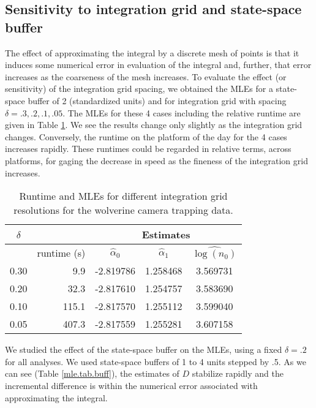 \subsection{Sensitivity to integration grid and state-space buffer}

The effect of approximating the integral by a discrete mesh of points
is that it induces some numerical error in evaluation of the integral
and, further, that error increases as the
coarseness of the mesh increases. 
To evaluate the effect (or sensitivity) of the integration grid
spacing, 
we obtained the MLEs for a state-space buffer of 2 (standardized
units) and for integration grid with spacing $\delta = .3, .2, .1,
.05$. The MLEs for these 4 cases including the relative runtime are
given in Table \ref{mle.tab.integration}.
We see the results change only slightly as the
integration grid changes. Conversely, the runtime on the platform of
the day for the 4 cases increases rapidly. 
These runtimes could be regarded in
relative terms,  across platforms, for gaging the decrease in
speed as the fineness of the integration grid increases.

\begin{table}[ht]
\centering
\caption{Runtime and MLEs for different integration grid resolutions
  for the wolverine camera trapping data.}
\begin{tabular}{crccc}
\hline \hline
$\delta$ &   & \multicolumn{3}{c}{Estimates} \\ \hline
         &  runtime (s)       & $\hat{\alpha}_0$ & $\hat{\alpha}_1$ &  $\widehat{\log(n_0)}$ \\ \hline
 0.30   &  9.9  &  -2.819786 & 1.258468 & 3.569731  \\
 0.20   & 32.3  &  -2.817610 & 1.254757 & 3.583690 \\
 0.10  & 115.1  &  -2.817570 & 1.255112 & 3.599040 \\
 0.05 &  407.3 &   -2.817559&  1.255281&  3.607158 \\ \hline
\end{tabular}
\label{mle.tab.integration}
\end{table}

We studied the effect of the state-space buffer on the MLEs, using a
fixed $\delta = .2$ for all analyses.  We used state-space buffers of
1 to 4 units stepped by .5.  As we can see (Table \ref{mle.tab.buff}),
the estimates of $D$ stabilize rapidly and the incremental difference
is within the numerical error associated with approximating the
integral.



